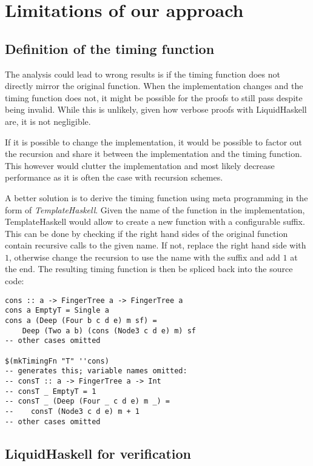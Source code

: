 \documentclass[sigplan,screen,review,anonymous]{acmart}
\begin{document}
\section{Limitations of our approach}\label{sec:limitations}

\subsection{Definition of the timing function}

The analysis could lead to wrong results is if the timing function does not directly mirror the original function. When the implementation changes and the timing function does not, it might be possible for the proofs to still pass despite being invalid. While this is unlikely, given how verbose proofs with LiquidHaskell are, it is not negligible.

If it is possible to change the implementation, it would be possible to factor out the recursion and share it between the implementation and the timing function. This however would clutter the implementation and most likely decrease performance as it is often the case with recursion schemes.

A better solution is to derive the timing function using meta programming in the form of \textit{TemplateHaskell}. Given the name of the function in the implementation, TemplateHaskell would allow to create a new function with a configurable suffix. This can be done by checking if the right hand sides of the original function contain recursive calls to the given name. If not, replace the right hand side with $1$, otherwise change the recursion to use the name with the suffix and add $1$ at the end. The resulting timing function is then be spliced back into the source code:

\begin{lstlisting}
cons :: a -> FingerTree a -> FingerTree a
cons a EmptyT = Single a
cons a (Deep (Four b c d e) m sf) =
    Deep (Two a b) (cons (Node3 c d e) m) sf
-- other cases omitted

$(mkTimingFn "T" ''cons)
-- generates this; variable names omitted:
-- consT :: a -> FingerTree a -> Int
-- consT _ EmptyT = 1
-- consT _ (Deep (Four _ c d e) m _) =
--    consT (Node3 c d e) m + 1
-- other cases omitted
\end{lstlisting}

\subsection{LiquidHaskell for verification}
\end{document}
